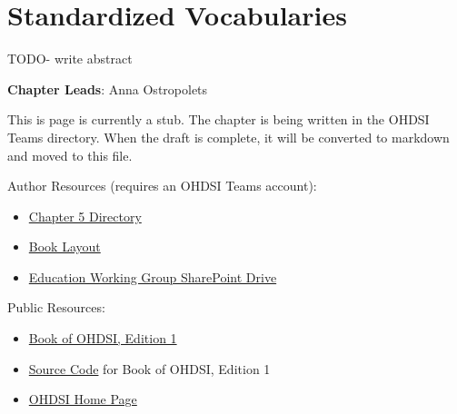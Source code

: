 \documentclass[
  letterpaper,
  paper=7in:10in,
  pagesize=pdftex,
  headinclude=on,
  footinclude=on,
  12pt]{scrbook}
\providecommand{\tightlist}{%
  \setlength{\itemsep}{0pt}\setlength{\parskip}{0pt}}\usepackage{longtable,booktabs,array}
\begin{document}
\chapter{Standardized
Vocabularies}\label{sec-representation-vocabularies}

TODO- write abstract

\hfill\break

\textbf{Chapter Leads}: Anna Ostropolets

\begin{tcolorbox}[enhanced jigsaw, opacitybacktitle=0.6, coltitle=black, colback=white, bottomrule=.15mm, bottomtitle=1mm, title=\textcolor{quarto-callout-note-color}{\faInfo}\hspace{0.5em}{Note}, titlerule=0mm, rightrule=.15mm, colbacktitle=quarto-callout-note-color!10!white, colframe=quarto-callout-note-color-frame, toptitle=1mm, arc=.35mm, left=2mm, breakable, opacityback=0, leftrule=.75mm, toprule=.15mm]

This is page is currently a stub. The chapter is being written in the
OHDSI Teams directory. When the draft is complete, it will be converted
to markdown and moved to this file.

Author Resources (requires an OHDSI Teams account):

\begin{itemize}
\tightlist
\item
  \href{https://ohdsiorg.sharepoint.com/sites/Workgroup-EducationWorkingGroup/Shared\%20Documents/Forms/AllItems.aspx?id=\%2Fsites\%2FWorkgroup\%2DEducationWorkingGroup\%2FShared\%20Documents\%2FSection\%20II\%20\%2D\%20Data\%2FChapter\%205\%20\%2D\%20Standardized\%20Vocabularies&viewid=05fec2cc\%2Dec8a\%2D4d04\%2Db565\%2Dcf1289b96f67}{Chapter
  5 Directory}
\item
  \href{https://ohdsiorg.sharepoint.com/:x:/r/sites/Workgroup-EducationWorkingGroup/_layouts/15/Doc2.aspx?action=edit&sourcedoc=\%7B1fa31e39-1c5f-4918-b878-609ebd9810b3\%7D&wdOrigin=TEAMS-WEB.teamsSdk_ns.rwc&wdExp=TEAMS-TREATMENT&wdhostclicktime=1748104477731&web=1}{Book
  Layout}
\item
  \href{https://ohdsiorg.sharepoint.com/sites/Workgroup-EducationWorkingGroup/Shared\%20Documents/Forms/AllItems.aspx?viewid=05fec2cc\%2Dec8a\%2D4d04\%2Db565\%2Dcf1289b96f67}{Education
  Working Group SharePoint Drive}
\end{itemize}

Public Resources:

\begin{itemize}
\tightlist
\item
  \href{https://ohdsi.github.io/TheBookOfOhdsi/}{Book of OHDSI, Edition
  1}
\item
  \href{https://github.com/OHDSI/TheBookOfOhdsi}{Source Code} for Book
  of OHDSI, Edition 1
\item
  \href{https://ohdsi.org/}{OHDSI Home Page}
\end{itemize}

\end{tcolorbox}
\end{document}
